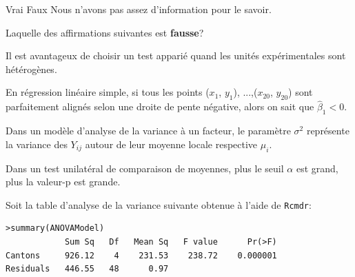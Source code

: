 \begin{questions}
\begin{parts}
\medskip   \begin{oneparcheckboxes}
        \choice Vrai 
        \CorrectChoice Faux
        \choice Nous n'avons pas assez d'information pour le savoir.
\medskip    \end{oneparcheckboxes}
    


\end{parts}
\medskip

\question[3]\label{QCManovaReg}

Laquelle des affirmations suivantes est \textbf{fausse}?

\medskip

\begin{checkboxes}
\choice Il est avantageux de choisir un test apparié quand les unités expérimentales sont hétérogènes.

\choice En régression linéaire simple, si tous les points ($x_1$, $y_1$), ...,($x_{20}$, $y_{20}$) sont parfaitement alignés selon une droite de pente négative, alors on sait que $\widehat{\beta}_1 <0$.


\choice Dans un modèle d’analyse de la variance à un facteur, le paramètre $\sigma^2$ représente la variance
des $Y_{ij}$ autour de leur moyenne locale respective $\mu_i$.

\correctchoice Dans un test unilatéral de comparaison de moyennes, plus le seuil $\alpha$ est grand, plus la valeur-p est grande.


\end{checkboxes}

\medskip
\question[3] Soit la table d'analyse de la variance suivante obtenue à l'aide de \texttt{Rcmdr}:
\begin{verbatim}
>summary(ANOVAModel)
            Sum Sq   Df   Mean Sq   F value      Pr(>F)    
Cantons     926.12    4    231.53    238.72    0.000001 
Residuals   446.55   48      0.97
\end{verbatim}


\end{questions}
